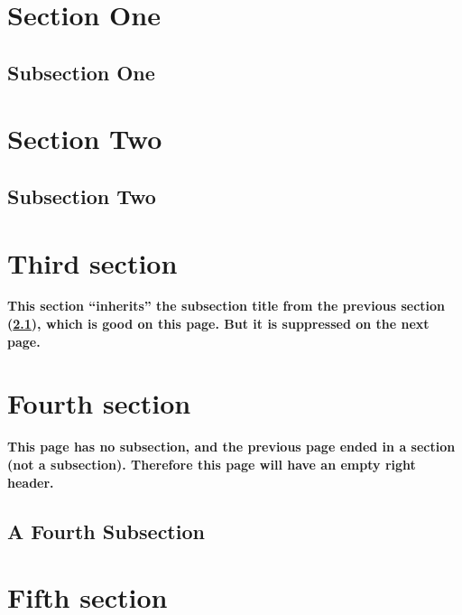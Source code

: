 \documentclass{article}
\begin{document}
\newpage
\pagestyle{fancy}

\section{Section One}

\subsection{Subsection One}

 \lipsum[1-2]

\section{Section Two}

 \lipsum[3]

\subsection{Subsection Two}
\label{sec:inherited}

 \lipsum[4-7]

\section{Third section}
\label{sec:flaw}

\textbf{This section ``inherits'' the subsection title from the
  previous section (\ref{sec:inherited}), which is good on this page. But it is suppressed on the next page.}

\medskip

\lipsum

\section{Fourth section}
\label{sec:missing}

{\bfseries This page has no subsection, and the previous page ended in a section (not a subsection). Therefore this page will have an empty right header.}

\medskip

\lipsum[1-4]

\subsection{A Fourth Subsection}

\lipsum[7-9]

\section{Fifth section}
\end{document}
